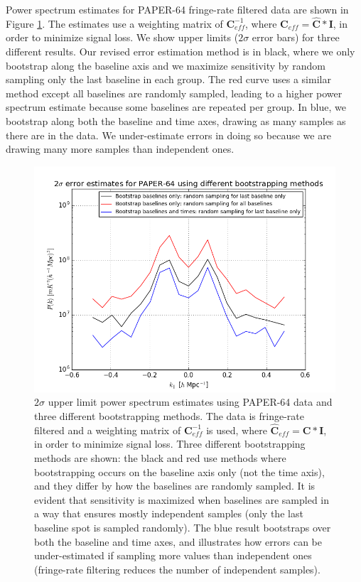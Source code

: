 \documentclass[preprint2,numberedappendix,tighten]{aastex6}  %
\begin{document}
Power spectrum estimates for PAPER-64 fringe-rate filtered data are shown in Figure \ref{fig:data_errors}. The estimates use a weighting matrix of $\textbf{C}_{eff}^{-1}$, where $\textbf{C}_{eff} = \hat{\textbf{C}}*\textbf{I}$, in order to minimize signal loss. We show upper limits ($2\sigma$ error bars) for three different results. Our revised error estimation method is in black, where we only bootstrap along the baseline axis and we maximize sensitivity by random sampling only the last baseline in each group. The red curve uses a similar method except all baselines are randomly sampled, leading to a higher power spectrum estimate because some baselines are repeated per group. In blue, we bootstrap along both the baseline and time axes, drawing as many samples as there are in the data. We under-estimate errors in doing so because we are drawing many more samples than independent ones.

\begin{figure}
	\centering
	\includegraphics[width=\columnwidth]{plots/data_errors.png}
	\caption{$2\sigma$ upper limit power spectrum estimates using PAPER-64 data and three different bootstrapping methods. The data is fringe-rate filtered and a weighting matrix of $\textbf{C}_{eff}^{-1}$ is used, where $\hat{\textbf{C}}_{eff} = \textbf{C}*\textbf{I}$, in order to minimize signal loss. Three different bootstrapping methods are shown: the black and red use methods where bootstrapping occurs on the baseline axis only (not the time axis), and they differ by how the baselines are randomly sampled. It is evident that sensitivity is maximized when baselines are sampled in a way that ensures mostly independent samples (only the last baseline spot is sampled randomly). The blue result bootstraps over both the baseline and time axes, and illustrates how errors can be under-estimated if sampling more values than independent ones (fringe-rate filtering reduces the number of independent samples).}
	\label{fig:data_errors}
\end{figure}
\end{document}
